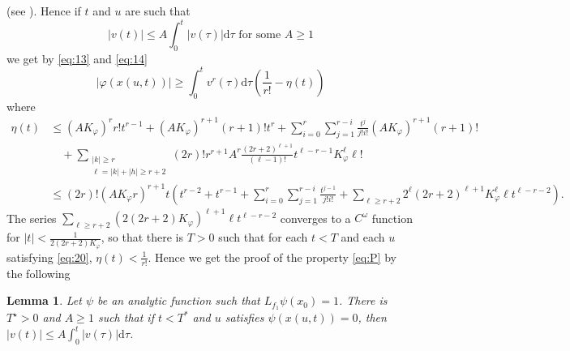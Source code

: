 \documentclass{article}
\newtheorem{lemma}{Lemma}[section]
\newcommand{\dd}{\mathrm{d}}
\begin{document}
(see \cite{1,3}).
Hence if $t$ and $u$ are such that
\begin{equation}
	\label{eq:20}
	|v(t)| \leq A \int_0^t|v(\tau)| \dd \tau \text { for some } A \geq 1
\end{equation}
we get by \eqref{eq:13} and \eqref{eq:14}
\begin{equation*}
	|\varphi(x(u, t))| \geq \int_0^t v^r(\tau) \dd \tau \left(\frac{1}{r !}-\eta(t)\right)
\end{equation*}
where
\begin{equation*}
	\begin{split}
		\eta(t) & \leq \left(A K_{\varphi}\right)^r r ! t^{r-1}+\left(A K_{\varphi}\right)^{r+1}(r+1) ! t^r+\sum_{i=0}^r \sum_{j=1}^{r-i} \frac{t^j}{j ! i !}\left(A K_{\varphi}\right)^{r+1}(r+1) ! \\
		& \quad +\sum_{\substack{|k| \geq r \\
				\ell=|k|+|h| \geq r+2}} (2 r) ! r^{r+1} A^r \frac{(2 r+2)^{\ell+1}}{(\ell-1) !} t^{\ell-r-1} K_{\varphi}^{\ell} \ell !  \\
		& \leq (2 r) !\left(A K_{\varphi} r\right)^{r+1} t\left(t^{r-2}+t^{r-1}+\sum_{i=0}^r \sum_{j=1}^{r-i} \frac{t^{j-1}}{j ! i !}+\sum_{\ell \geq r+2} 2^\ell (2r+2)^{\ell+1} K_\varphi^\ell \ell t^{\ell-r-2}\right).
	\end{split}
\end{equation*}
The series $\sum_{\ell \geq r+2}\left(2(2 r+2) K_{\varphi}\right)^{\ell+1} \ell t^{\ell-r-2}$ converges to a $C^\omega$ function for $|t|<\frac{1}{2(2 r+2) K_{\varphi}}$, so that there is $T>0$ such that for each $t<T$ and each $u$ satisfying \eqref{eq:20}, $\eta(t)<\frac{1}{r !}$.
Hence we get the proof of the property \eqref{eq:P} by the following



\begin{lemma} \label{lem:3.2}
	Let $\psi$ be an analytic function such that $L_{f_1} \psi\left(x_0\right)=1$. 
	There is $T^{\star}>0$ and $A \geq 1$ such that if $t<T^*$ and $u$ satisfies $\psi(x(u, t))=0$, then $|v(t)| \leq A \int_0^t|v(\tau)| \dd \tau$.
\end{lemma}
\end{document}
